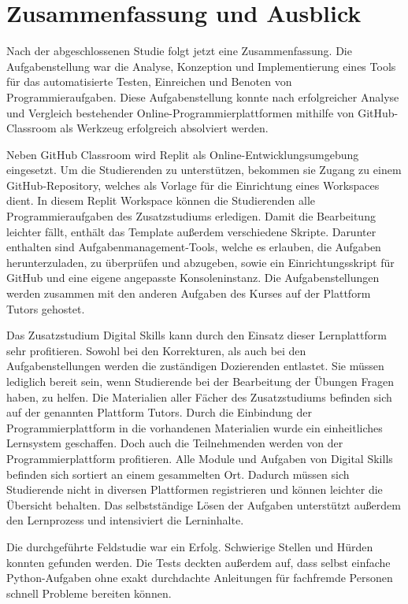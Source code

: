 \section{Zusammenfassung und Ausblick}\label{zusammenfassung-u-ausblick}
Nach der abgeschlossenen Studie folgt jetzt eine Zusammenfassung. Die
Aufgabenstellung war die Analyse, Konzeption und Implementierung eines Tools
für das automatisierte Testen, Einreichen und Benoten von Programmieraufgaben.
Diese Aufgabenstellung konnte nach erfolgreicher Analyse und Vergleich
bestehender Online-Programmierplattformen mithilfe von GitHub-Classroom als
Werkzeug erfolgreich absolviert werden.

Neben GitHub Classroom wird Replit als Online-Entwicklungsumgebung eingesetzt.
Um die Studierenden zu unterstützen, bekommen sie Zugang zu einem
GitHub-Repository, welches als Vorlage für die Einrichtung eines Workspaces
dient. In diesem Replit Workspace können die Studierenden alle
Programmieraufgaben des Zusatzstudiums erledigen. Damit die Bearbeitung leichter
fällt, enthält das Template außerdem verschiedene Skripte. Darunter enthalten
sind Aufgabenmanagement-Tools, welche es erlauben, die Aufgaben herunterzuladen,
zu überprüfen und abzugeben, sowie ein Einrichtungsskript für GitHub und eine
eigene angepasste Konsoleninstanz. Die Aufgabenstellungen werden zusammen mit
den anderen Aufgaben des Kurses auf der Plattform Tutors gehostet.

Das Zusatzstudium Digital Skills kann durch den Einsatz dieser
Lernplattform sehr profitieren. Sowohl bei den Korrekturen, als auch bei den 
Aufgabenstellungen werden die zuständigen Dozierenden entlastet. Sie müssen
lediglich bereit sein, wenn Studierende bei der Bearbeitung der Übungen Fragen
haben, zu helfen. Die Materialien aller Fächer des Zusatzstudiums befinden sich
auf der genannten Plattform Tutors. Durch die Einbindung der
Programmierplattform in die vorhandenen Materialien wurde ein einheitliches
Lernsystem geschaffen. Doch auch die Teilnehmenden werden von der
Programmierplattform profitieren. Alle Module und Aufgaben von Digital Skills
befinden sich sortiert an einem gesammelten Ort. Dadurch müssen sich Studierende
nicht in diversen Plattformen registrieren und können leichter die Übersicht
behalten. Das selbstständige Lösen der Aufgaben unterstützt außerdem den
Lernprozess und intensiviert die Lerninhalte.

Die durchgeführte Feldstudie war ein Erfolg. Schwierige Stellen und Hürden
konnten gefunden werden. Die Tests deckten außerdem auf, dass selbst einfache
Python-Aufgaben ohne exakt durchdachte Anleitungen für fachfremde Personen
schnell Probleme bereiten können.


